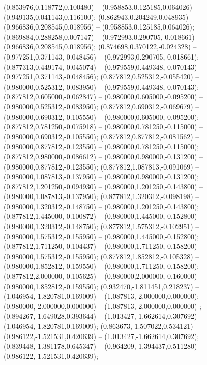  (0.853976,0.118772,0.100480) -- (0.958853,0.125185,0.064026) -- (0.949135,0.041143,0.116100);
 (0.862943,0.204249,0.048935) -- (0.966836,0.208545,0.018956) -- (0.958853,0.125185,0.064026);
 (0.869884,0.288258,0.007147) -- (0.972993,0.290705,-0.018661) -- (0.966836,0.208545,0.018956);
 (0.874698,0.370122,-0.024328) -- (0.977251,0.371143,-0.048456) -- (0.972993,0.290705,-0.018661);
 (0.877313,0.449174,-0.045074) -- (0.979559,0.449348,-0.070143) -- (0.977251,0.371143,-0.048456);
 (0.877812,0.525312,-0.055420) -- (0.980000,0.525312,-0.083950) -- (0.979559,0.449348,-0.070143);
 (0.877812,0.605000,-0.062847) -- (0.980000,0.605000,-0.095200) -- (0.980000,0.525312,-0.083950);
 (0.877812,0.690312,-0.069679) -- (0.980000,0.690312,-0.105550) -- (0.980000,0.605000,-0.095200);
 (0.877812,0.781250,-0.075918) -- (0.980000,0.781250,-0.115000) -- (0.980000,0.690312,-0.105550);
 (0.877812,0.877812,-0.081562) -- (0.980000,0.877812,-0.123550) -- (0.980000,0.781250,-0.115000);
 (0.877812,0.980000,-0.086612) -- (0.980000,0.980000,-0.131200) -- (0.980000,0.877812,-0.123550);
 (0.877812,1.087813,-0.091069) -- (0.980000,1.087813,-0.137950) -- (0.980000,0.980000,-0.131200);
 (0.877812,1.201250,-0.094930) -- (0.980000,1.201250,-0.143800) -- (0.980000,1.087813,-0.137950);
 (0.877812,1.320312,-0.098198) -- (0.980000,1.320312,-0.148750) -- (0.980000,1.201250,-0.143800);
 (0.877812,1.445000,-0.100872) -- (0.980000,1.445000,-0.152800) -- (0.980000,1.320312,-0.148750);
 (0.877812,1.575312,-0.102951) -- (0.980000,1.575312,-0.155950) -- (0.980000,1.445000,-0.152800);
 (0.877812,1.711250,-0.104437) -- (0.980000,1.711250,-0.158200) -- (0.980000,1.575312,-0.155950);
 (0.877812,1.852812,-0.105328) -- (0.980000,1.852812,-0.159550) -- (0.980000,1.711250,-0.158200);
 (0.877812,2.000000,-0.105625) -- (0.980000,2.000000,-0.160000) -- (0.980000,1.852812,-0.159550);
 (0.932470,-1.811451,0.218237) -- (1.046954,-1.820781,0.169009) -- (1.087813,-2.000000,0.000000);
 (0.980000,-2.000000,0.000000) -- (1.087813,-2.000000,0.000000) ;
 (0.894267,-1.649028,0.393644) -- (1.013427,-1.662614,0.307692) -- (1.046954,-1.820781,0.169009);
 (0.863673,-1.507022,0.534121) -- (0.986122,-1.521531,0.420639) -- (1.013427,-1.662614,0.307692);
 (0.839448,-1.381178,0.645347) -- (0.964209,-1.394437,0.511280) -- (0.986122,-1.521531,0.420639);

